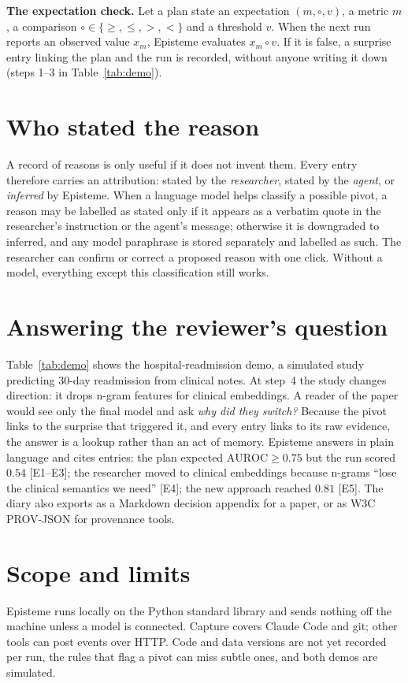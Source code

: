 \documentclass[10pt,twocolumn]{article}
\begin{document}
\textbf{The expectation check.} Let a plan state an expectation $(m, \circ, v)$, a metric $m$, a comparison
$\circ \in \{\ge, \le, >, <\}$ and a threshold $v$. When the next run reports an observed value $x_m$, Episteme
evaluates $x_m \circ v$. If it is false, a surprise entry linking the plan and the run is recorded, without anyone
writing it down (steps 1--3 in Table~\ref{tab:demo}).

\section{Who stated the reason}
A record of reasons is only useful if it does not invent them. Every entry therefore carries an attribution:
stated by the \emph{researcher}, stated by the \emph{agent}, or \emph{inferred} by Episteme. When a language model
helps classify a possible pivot, a reason may be labelled as stated only if it appears as a verbatim quote in
the researcher's instruction or the agent's message; otherwise it is downgraded to inferred, and any model
paraphrase is stored separately and labelled as such. The researcher can confirm or correct a proposed reason
with one click. Without a model, everything except this classification still works.

\section{Answering the reviewer's question}
Table~\ref{tab:demo} shows the hospital-readmission demo, a simulated study predicting 30-day readmission from
clinical notes. At step~4 the study changes direction: it drops n-gram features for clinical embeddings. A
reader of the paper would see only the final model and ask \emph{why did they switch?} Because the pivot links
to the surprise that triggered it, and every entry links to its raw evidence, the answer is a lookup rather
than an act of memory. Episteme answers in plain language and cites entries: the plan expected $\mathrm{AUROC}\ge0.75$ but the run scored $0.54$
[E1--E3]; the researcher moved to clinical embeddings because n-grams ``lose the clinical semantics we need''
[E4]; the new approach reached $0.81$ [E5]. The diary also exports as a Markdown decision appendix for a paper,
or as W3C PROV-JSON for provenance tools.

\section{Scope and limits}
Episteme runs locally on the Python standard library and sends nothing off the machine unless a model is
connected. Capture covers Claude Code and git; other tools can post events over HTTP. Code and data versions are
not yet recorded per run, the rules that flag a pivot can miss subtle ones, and both demos are simulated.
\end{document}
